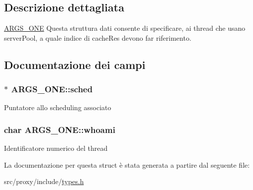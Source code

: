 \subsection{Descrizione dettagliata}
\hyperlink{structARGS__ONE}{ARGS\_\-ONE} Questa struttura dati consente di specificare, ai thread che usano serverPool, a quale indice di cacheRes devono far riferimento. 

\subsection{Documentazione dei campi}
\hypertarget{structARGS__ONE_a2ab0ae198a435c7ac8eba5989ff4650b}{
\subsubsection[{sched}]{$\ast$ {\bf ARGS\_\-ONE::sched}}}
\label{structARGS__ONE_a2ab0ae198a435c7ac8eba5989ff4650b}
Puntatore allo scheduling associato \hypertarget{structARGS__ONE_a655646e2e844c6563932c042bdeed66c}{
\subsubsection[{whoami}]{\setlength{\rightskip}{0pt plus 5cm}char {\bf ARGS\_\-ONE::whoami}}}
\label{structARGS__ONE_a655646e2e844c6563932c042bdeed66c}
Identificatore numerico del thread 

La documentazione per questa struct è stata generata a partire dal seguente file:\begin{DoxyCompactItemize}
\item 
src/proxy/include/\hyperlink{types_8h}{types.h}\end{DoxyCompactItemize}
